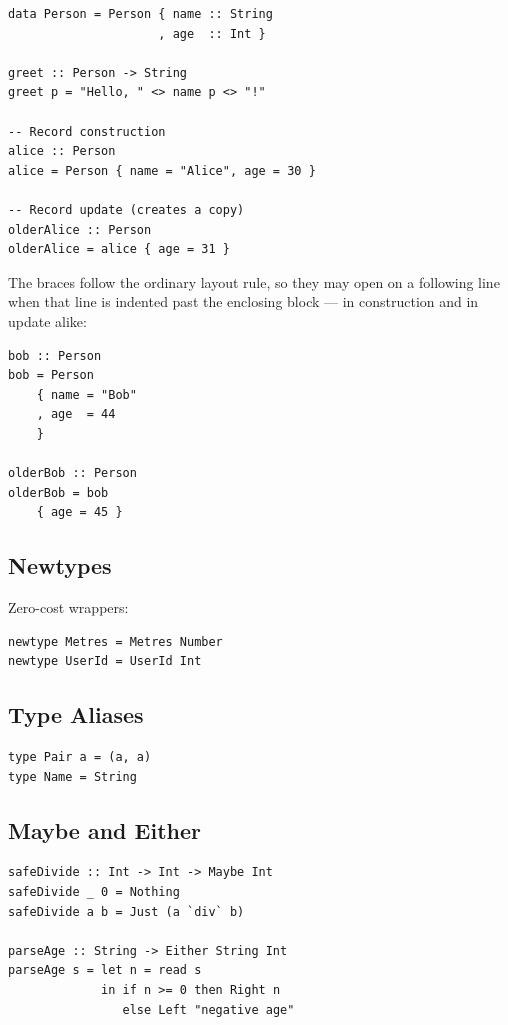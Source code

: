 \documentclass[11pt,a4paper]{article}
\begin{document}
\begin{lstlisting}
data Person = Person { name :: String
                     , age  :: Int }

greet :: Person -> String
greet p = "Hello, " <> name p <> "!"

-- Record construction
alice :: Person
alice = Person { name = "Alice", age = 30 }

-- Record update (creates a copy)
olderAlice :: Person
olderAlice = alice { age = 31 }
\end{lstlisting}

The braces follow the ordinary layout rule, so they may open on a
following line when that line is indented past the enclosing block ---
in construction and in update alike:

\begin{lstlisting}
bob :: Person
bob = Person
    { name = "Bob"
    , age  = 44
    }

olderBob :: Person
olderBob = bob
    { age = 45 }
\end{lstlisting}

\subsection{Newtypes}

Zero-cost wrappers:

\begin{lstlisting}
newtype Metres = Metres Number
newtype UserId = UserId Int
\end{lstlisting}

\subsection{Type Aliases}

\begin{lstlisting}
type Pair a = (a, a)
type Name = String
\end{lstlisting}

\subsection{Maybe and Either}

\begin{lstlisting}
safeDivide :: Int -> Int -> Maybe Int
safeDivide _ 0 = Nothing
safeDivide a b = Just (a `div` b)

parseAge :: String -> Either String Int
parseAge s = let n = read s
             in if n >= 0 then Right n
                else Left "negative age"
\end{lstlisting}
\end{document}
